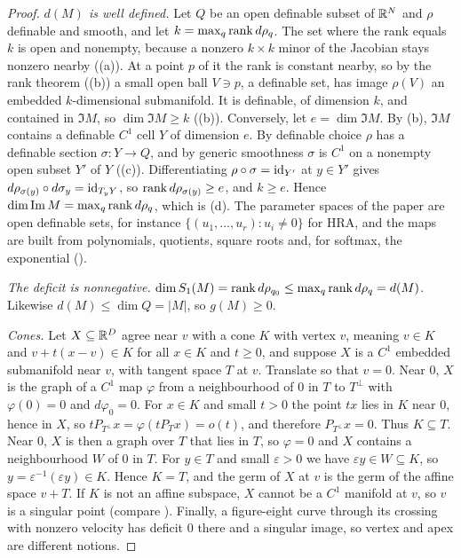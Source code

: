 \begin{proof}
\emph{$d(M)$ is well defined.} Let $Q$ be an open definable subset of $\mathbb{R}^N$ and $\rho$ definable and smooth, and let
$k=\max_q\operatorname{rank} d\rho_q$. The set where the rank equals $k$ is open and nonempty, because a nonzero $k\times k$ minor of the
Jacobian stays nonzero nearby ((a)). At a point $p$ of it the rank is constant nearby, so by the rank theorem
((b)) a small open ball $V\ni p$, a definable set, has image $\rho(V)$ an embedded $k$-dimensional
submanifold. It is definable, of dimension $k$, and contained in $\Im M$, so $\dim\Im M\ge k$ ((b)).
Conversely, let $e=\dim\Im M$. By (b), $\Im M$ contains a definable $C^1$ cell $Y$ of dimension $e$. By
definable choice $\rho$ has a definable section $\sigma:Y\to Q$, and by generic smoothness $\sigma$ is $C^1$ on a nonempty
open subset $Y'$ of $Y$ ((c)). Differentiating $\rho\circ\sigma=\mathrm{id}_{Y'}$ at $y\in Y'$ gives
$d\rho_{\sigma(y)}\circ d\sigma_y=\mathrm{id}_{T_yY}$, so $\operatorname{rank} d\rho_{\sigma(y)}\ge e$, and $k\ge e$. Hence
$\dim\operatorname{Im} M=\max_q\operatorname{rank} d\rho_q$, which is (d). The parameter spaces of the paper are open definable sets, for
instance $\{(u_1,\dots,u_r):u_i\ne0\}$ for HRA, and the maps are built from polynomials, quotients, square roots and, for
softmax, the exponential ().

\emph{The deficit is nonnegative.} $\dim S_1(M)=\operatorname{rank} d\rho_{q_0}\le\max_q\operatorname{rank} d\rho_q=d(M)$. Likewise
$d(M)\le\dim Q=\lvert M\rvert$, so $g(M)\ge0$.

\emph{Cones.} Let $X\subseteq\mathbb{R}^D$ agree near $v$ with a cone $K$ with vertex $v$, meaning $v\in K$ and
$v+t(x-v)\in K$ for all $x\in K$ and $t\ge0$, and suppose $X$ is a $C^1$ embedded submanifold near $v$, with tangent space
$T$ at $v$. Translate so that $v=0$. Near $0$, $X$ is the graph of a $C^1$ map $\varphi$ from a neighbourhood of $0$ in
$T$ to $T^\perp$ with $\varphi(0)=0$ and $d\varphi_0=0$. For $x\in K$ and small $t>0$ the point $tx$ lies in $K$ near $0$,
hence in $X$, so $tP_{T^\perp}x=\varphi(tP_Tx)=o(t)$, and therefore $P_{T^\perp}x=0$. Thus $K\subseteq T$. Near $0$, $X$
is then a graph over $T$ that lies in $T$, so $\varphi=0$ and $X$ contains a neighbourhood $W$ of $0$ in $T$. For $y\in
T$ and small $\varepsilon>0$ we have $\varepsilon y\in W\subseteq K$, so $y=\varepsilon^{-1}(\varepsilon y)\in K$. Hence
$K=T$, and the germ of $X$ at $v$ is the germ of the affine space $v+T$. If $K$ is not an affine subspace, $X$ cannot be a
$C^1$ manifold at $v$, so $v$ is a singular point (compare ). Finally, a figure-eight curve through its
crossing with nonzero velocity has deficit $0$ there and a singular image, so vertex and apex are different notions.
\end{proof}

